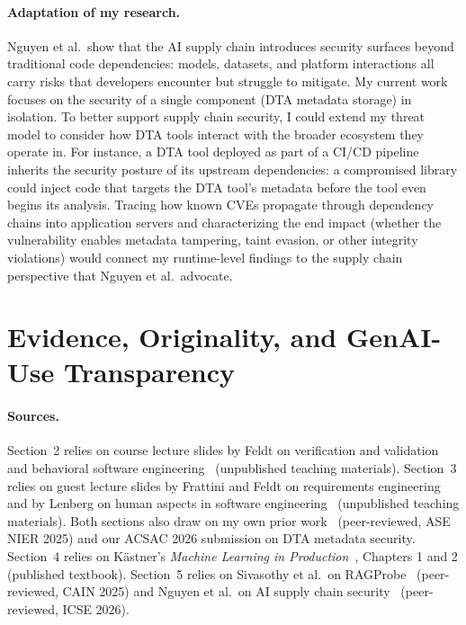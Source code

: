 \documentclass[a4paper,11pt]{article}
\theoremstyle{plain}
\begin{document}
\paragraph{Adaptation of my research.}
Nguyen et al.\ show that the AI supply chain introduces security surfaces beyond traditional code dependencies: models, datasets, and platform interactions all carry risks that developers encounter but struggle to mitigate. My current work focuses on the security of a single component (DTA metadata storage) in isolation. To better support supply chain security, I could extend my threat model to consider how DTA tools interact with the broader ecosystem they operate in. For instance, a DTA tool deployed as part of a CI/CD pipeline inherits the security posture of its upstream dependencies: a compromised library could inject code that targets the DTA tool's metadata before the tool even begins its analysis. Tracing how known CVEs propagate through dependency chains into application servers and characterizing the end impact (whether the vulnerability enables metadata tampering, taint evasion, or other integrity violations) would connect my runtime-level findings to the supply chain perspective that Nguyen et al.\ advocate.

\section{Evidence, Originality, and GenAI-Use Transparency}

\paragraph{Sources.}

Section~2 relies on course lecture slides by Feldt on verification and validation~\cite{feldt2026qa} and behavioral software engineering~\cite{feldt2026bse} (unpublished teaching materials). Section~3 relies on guest lecture slides by Frattini and Feldt on requirements engineering~\cite{frattini2026re} and by Lenberg on human aspects in software engineering~\cite{lenberg2026bse} (unpublished teaching materials). Both sections also draw on my own prior work~\cite{wu2025} (peer-reviewed, ASE NIER 2025) and our ACSAC 2026 submission on DTA metadata security. Section~4 relies on Kästner's \textit{Machine Learning in Production}~\cite{kaestner2025mlip}, Chapters 1 and 2 (published textbook). Section~5 relies on Sivasothy et al.\ on RAGProbe~\cite{sivasothy2025ragprobe} (peer-reviewed, CAIN 2025) and Nguyen et al.\ on AI supply chain security~\cite{nguyen2026supplychain} (peer-reviewed, ICSE 2026). 
\end{document}
